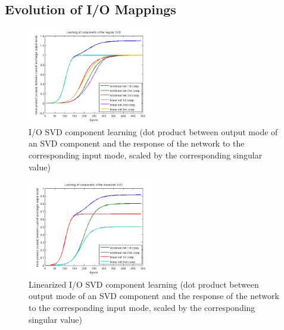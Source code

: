 \documentclass[10pt,letterpaper]{article}
\begin{document}
 
\subsection{Evolution of I/O Mappings}
\begin{figure}
\centering
\includegraphics[width=0.5\textwidth]{figures/regular_SVD_component_learning.png}
\caption{I/O SVD component learning (dot product between output mode of an SVD component and the response of the network to the corresponding input mode, scaled by the corresponding singular value)}
\label{regular_SVD_component_learning}
\end{figure}

\begin{figure}
\includegraphics[width=0.5\textwidth]{figures/linearized_SVD_component_learning.png}
\caption{Linearized I/O SVD component learning (dot product between output mode of an SVD component and the response of the network to the corresponding input mode, scaled by the corresponding singular value)}
\label{linearized_SVD_component_learning}
\end{figure}
\end{document}
